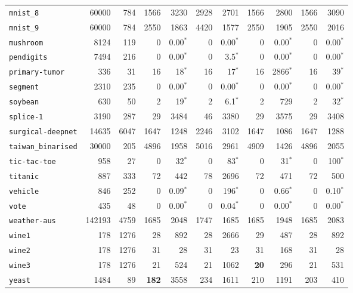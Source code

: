 \begin{tabular}{lccrrrrrrrr}
\texttt{mnist\_8} & \multicolumn{1}{r}{60000} & \multicolumn{1}{r}{784}  & 1566 & 3230 & 2928 & 2701 & 1566 & 2800 & 1566 & 3090\\
\texttt{mnist\_9} & \multicolumn{1}{r}{60000} & \multicolumn{1}{r}{784}  & 2550 & 1863 & 4420 & 1577 & 2550 & 1905 & 2550 & 2016\\
\texttt{mushroom} & \multicolumn{1}{r}{8124} & \multicolumn{1}{r}{119}  & 0 & 0.00$^*$ & 0 & 0.00$^*$ & 0 & 0.00$^*$ & 0 & 0.00$^*$\\
\texttt{pendigits} & \multicolumn{1}{r}{7494} & \multicolumn{1}{r}{216}  & 0 & 0.00$^*$ & 0 & 3.5$^*$ & 0 & 0.00$^*$ & 0 & 0.00$^*$\\
\texttt{primary-tumor} & \multicolumn{1}{r}{336} & \multicolumn{1}{r}{31}  & 16 & 18$^*$ & 16 & 17$^*$ & 16 & 2866$^*$ & 16 & 39$^*$\\
\texttt{segment} & \multicolumn{1}{r}{2310} & \multicolumn{1}{r}{235}  & 0 & 0.00$^*$ & 0 & 0.00$^*$ & 0 & 0.00$^*$ & 0 & 0.00$^*$\\
\texttt{soybean} & \multicolumn{1}{r}{630} & \multicolumn{1}{r}{50}  & 2 & 19$^*$ & 2 & 6.1$^*$ & 2 & 729 & 2 & 32$^*$\\
\texttt{splice-1} & \multicolumn{1}{r}{3190} & \multicolumn{1}{r}{287}  & 29 & 3484 & 46 & 3380 & 29 & 3575 & 29 & 3408\\
\texttt{surgical-deepnet} & \multicolumn{1}{r}{14635} & \multicolumn{1}{r}{6047}  & 1647 & 1248 & 2246 & 3102 & 1647 & 1086 & 1647 & 1288\\
\texttt{taiwan\_binarised} & \multicolumn{1}{r}{30000} & \multicolumn{1}{r}{205}  & 4896 & 1958 & 5016 & 2961 & 4909 & 1426 & 4896 & 2055\\
\texttt{tic-tac-toe} & \multicolumn{1}{r}{958} & \multicolumn{1}{r}{27}  & 0 & 32$^*$ & 0 & 83$^*$ & 0 & 31$^*$ & 0 & 100$^*$\\
\texttt{titanic} & \multicolumn{1}{r}{887} & \multicolumn{1}{r}{333}  & 72 & 442 & 78 & 2696 & 72 & 471 & 72 & 500\\
\texttt{vehicle} & \multicolumn{1}{r}{846} & \multicolumn{1}{r}{252}  & 0 & 0.09$^*$ & 0 & 196$^*$ & 0 & 0.66$^*$ & 0 & 0.10$^*$\\
\texttt{vote} & \multicolumn{1}{r}{435} & \multicolumn{1}{r}{48}  & 0 & 0.00$^*$ & 0 & 0.04$^*$ & 0 & 0.00$^*$ & 0 & 0.00$^*$\\
\texttt{weather-aus} & \multicolumn{1}{r}{142193} & \multicolumn{1}{r}{4759}  & 1685 & 2048 & 1747 & 1685 & 1685 & 1948 & 1685 & 2083\\
\texttt{wine1} & \multicolumn{1}{r}{178} & \multicolumn{1}{r}{1276}  & 28 & 892 & 28 & 2666 & 29 & 487 & 28 & 892\\
\texttt{wine2} & \multicolumn{1}{r}{178} & \multicolumn{1}{r}{1276}  & 31 & 28 & 31 & 23 & 31 & 168 & 31 & 28\\
\texttt{wine3} & \multicolumn{1}{r}{178} & \multicolumn{1}{r}{1276}  & 21 & 524 & 21 & 1062 & \textbf{20} & 296 & 21 & 531\\
\texttt{yeast} & \multicolumn{1}{r}{1484} & \multicolumn{1}{r}{89}  & \textbf{182} & 3558 & 234 & 1611 & 210 & 1191 & 203 & 410\\
\bottomrule
\end{tabular}
